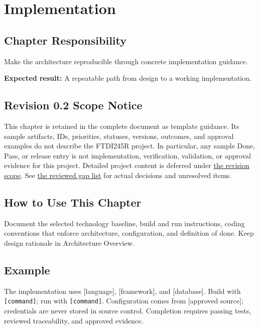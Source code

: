 \chapter{Implementation}
\section{Chapter Responsibility}
\label{Section:ImplementationResponsibility}
Make the architecture reproducible through concrete implementation guidance.

\noindent\textbf{Expected result:} A repeatable path from design to a working implementation.

\section{Revision 0.2 Scope Notice}
\label{Section:DeferredImplementation}
\begin{fsaNote}
This chapter is retained in the complete document as template guidance.
Its sample artifacts, IDs, priorities, statuses, versions, outcomes, and
approval examples do not describe the FTDI245R project. In particular, any
sample Done, Pass, or release entry is not implementation, verification,
validation, or approval evidence for this project. Detailed project content
is deferred under \hyperref[Section:ProjectScope]{the revision scope}.
See \hyperref[Table:ProjectGapReview]{the reviewed gap list} for actual
decisions and unresolved items.
\end{fsaNote}

\section{How to Use This Chapter}
Document the selected technology baseline, build and run instructions, coding conventions that enforce architecture, configuration, and definition of done. Keep design rationale in Architecture Overview.
\section{Example}
The implementation uses [language], [framework], and [database]. Build with \texttt{[command]}; run with \texttt{[command]}. Configuration comes from [approved source]; credentials are never stored in source control. Completion requires passing tests, reviewed traceability, and approved evidence.

